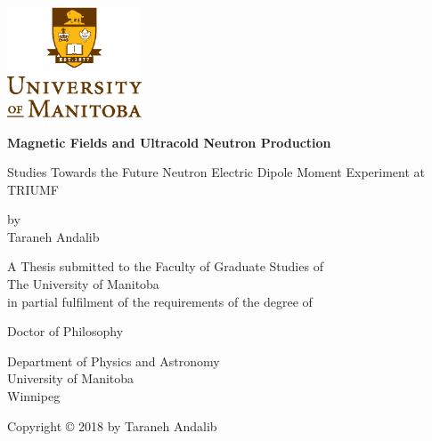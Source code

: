 \documentclass[12pt,a4paper]{book}
\begin{document}

\noindent
\begin{titlepage}
  \begin{center}
         \includegraphics[width=0.3\textwidth]{university.eps}\\
        \vspace*{1cm}
        
        \textbf{Magnetic Fields and Ultracold Neutron Production }
        
        \vspace{0.5cm} Studies Towards the Future Neutron Electric Dipole
        Moment Experiment at TRIUMF
        
        \vspace{1.5cm}
        
        by\\
        \vspace{1.0cm}
        Taraneh Andalib

        \vspace{2.5cm}
        A Thesis submitted to the Faculty of Graduate Studies of\\
        \vspace{0.5cm}
        The University of Manitoba\\
        \vspace{0.5cm}
        in partial fulfilment of the requirements of the degree of
        
        \vspace{2.0cm}
        
       
        Doctor of Philosophy\\
       \vspace{0.5cm}
        
   
        \vspace{0.5cm}
        Department of Physics and Astronomy\\
        University of Manitoba\\
        Winnipeg

        \vspace{3.0cm}
        Copyright © 2018 by Taraneh Andalib
        
    \end{center}
\end{titlepage}
\end{document}
